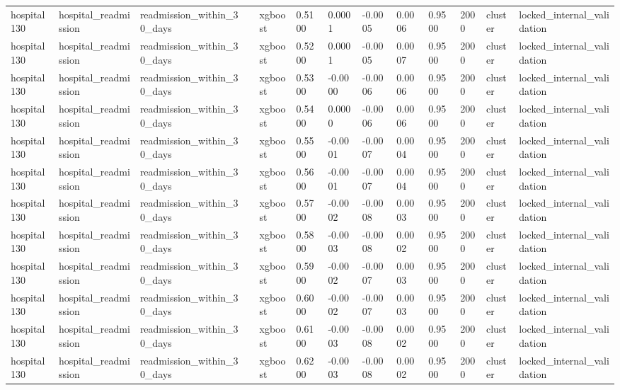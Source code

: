 \begin{tabular}{lllllllllllll}
hospital130 & hospital\_readmission & readmission\_within\_30\_days &  & xgboost & 0.5100 & 0.0001 & -0.0005 & 0.0006 & 0.9500 & 2000 & cluster & locked\_internal\_validation \\
hospital130 & hospital\_readmission & readmission\_within\_30\_days &  & xgboost & 0.5200 & 0.0001 & -0.0005 & 0.0007 & 0.9500 & 2000 & cluster & locked\_internal\_validation \\
hospital130 & hospital\_readmission & readmission\_within\_30\_days &  & xgboost & 0.5300 & -0.0000 & -0.0006 & 0.0006 & 0.9500 & 2000 & cluster & locked\_internal\_validation \\
hospital130 & hospital\_readmission & readmission\_within\_30\_days &  & xgboost & 0.5400 & 0.0000 & -0.0006 & 0.0006 & 0.9500 & 2000 & cluster & locked\_internal\_validation \\
hospital130 & hospital\_readmission & readmission\_within\_30\_days &  & xgboost & 0.5500 & -0.0001 & -0.0007 & 0.0004 & 0.9500 & 2000 & cluster & locked\_internal\_validation \\
hospital130 & hospital\_readmission & readmission\_within\_30\_days &  & xgboost & 0.5600 & -0.0001 & -0.0007 & 0.0004 & 0.9500 & 2000 & cluster & locked\_internal\_validation \\
hospital130 & hospital\_readmission & readmission\_within\_30\_days &  & xgboost & 0.5700 & -0.0002 & -0.0008 & 0.0003 & 0.9500 & 2000 & cluster & locked\_internal\_validation \\
hospital130 & hospital\_readmission & readmission\_within\_30\_days &  & xgboost & 0.5800 & -0.0003 & -0.0008 & 0.0002 & 0.9500 & 2000 & cluster & locked\_internal\_validation \\
hospital130 & hospital\_readmission & readmission\_within\_30\_days &  & xgboost & 0.5900 & -0.0002 & -0.0007 & 0.0003 & 0.9500 & 2000 & cluster & locked\_internal\_validation \\
hospital130 & hospital\_readmission & readmission\_within\_30\_days &  & xgboost & 0.6000 & -0.0002 & -0.0007 & 0.0003 & 0.9500 & 2000 & cluster & locked\_internal\_validation \\
hospital130 & hospital\_readmission & readmission\_within\_30\_days &  & xgboost & 0.6100 & -0.0003 & -0.0008 & 0.0002 & 0.9500 & 2000 & cluster & locked\_internal\_validation \\
hospital130 & hospital\_readmission & readmission\_within\_30\_days &  & xgboost & 0.6200 & -0.0003 & -0.0008 & 0.0002 & 0.9500 & 2000 & cluster & locked\_internal\_validation \\

\end{tabular}
